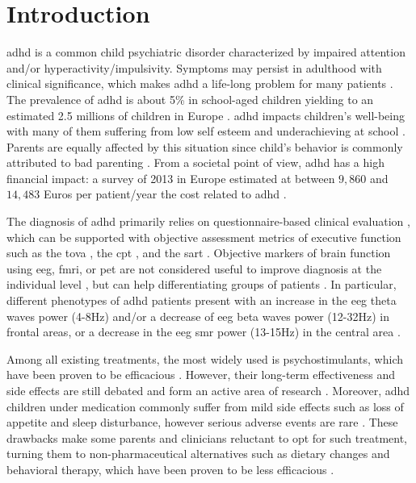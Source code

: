 

\section{Introduction} 

\gls{adhd} is a common child psychiatric disorder characterized by impaired attention and/or hyperactivity/impulsivity.
Symptoms may persist in adulthood with clinical significance, which makes \gls{adhd} a life-long problem for many
patients \citep{Faraone2006}. The prevalence of \gls{adhd} is about 5\% in school-aged children yielding to an estimated
2.5 millions of children in Europe \citep{DSM-5}. \gls{adhd} impacts children's well-being with many of them suffering
from low self esteem \citep{Shaw2005} and underachieving at school \citep{Barry2002}. Parents are equally affected by this
situation since child's behavior is commonly attributed to bad parenting \citep{Harpin2005}. From a societal point
of view, \gls{adhd} has a high financial impact: a survey of 2013 in Europe estimated at between $9,860$ and 
$14,483$ Euros per patient/year the cost related to \gls{adhd} \citep{le2014}. 

The diagnosis of \gls{adhd} primarily relies on questionnaire-based clinical evaluation \citep{DSM-5}, which can be
supported with objective assessment metrics of executive function such as the \gls{tova} \citep{Forbes1998}, the
\gls{cpt} \citep{Barkley1991}, and the \gls{sart} \citep{Robertson1997}. Objective markers of brain function
using \gls{eeg}, \gls{fmri}, or \gls{pet} are not considered useful to improve diagnosis at the individual
level \citep{Neba}, but can help differentiating groups of patients \citep{Johnstone2005}.  
In particular, different phenotypes of \gls{adhd} patients present with an increase in the \gls{eeg} theta waves 
power (4-8Hz) and/or a decrease of \gls{eeg} beta waves power (12-32Hz) in frontal areas, or a decrease in the \gls{eeg} 
\gls{smr} power (13-15Hz) in the central area \citep{Monastra2005, Matouvsek1984, Janzen1995, loo2017}.  

Among all existing treatments, the most widely used is psychostimulants, which have been proven to be efficacious
\citep{Taylor2014, Storebo2015}. However, their long-term effectiveness and side effects are still debated and form 
an active area of research \citep{DuPaul1998, Swanson2001, Jensen1999}. Moreover, \gls{adhd} children under medication 
commonly suffer from mild side effects such as loss of appetite and sleep disturbance, however serious adverse events
are rare \citep{Storebo2015, Cooper2011}. These drawbacks make some parents and clinicians reluctant to 
opt for such treatment, turning them to non-pharmaceutical alternatives such as dietary changes \citep{Belanger2009} and behavioral 
therapy, which have been proven to be less efficacious \citep{Sonuga-Barke2013}.

